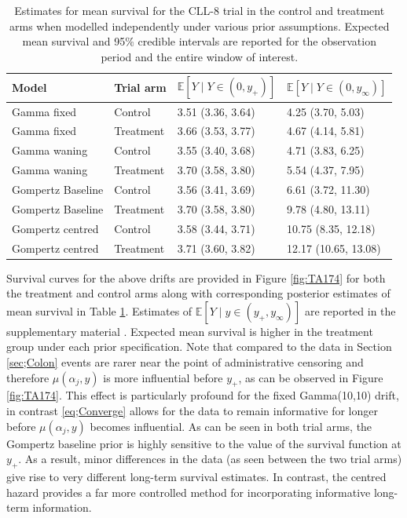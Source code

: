 \documentclass[ba,preprint]{imsart}
\theoremstyle{plain}
\theoremstyle{definition}
\theoremstyle{remark}
\begin{document}
\begin{table}[]
    \centering
    \begin{tabular}{l|l|l|l}
       Model & Trial arm & {\color{red}$\mathbb{E}[Y\mid Y \in (0,y_+)]$} & {\color{red}$\mathbb{E}[Y\mid Y \in (0,y_\infty)]$}\\
       \hline
        Gamma fixed  & Control  & 3.51 (3.36, 3.64) & 4.25 (3.70, 5.03) \\
        Gamma fixed  & Treatment  & 3.66	(3.53, 3.77) & 4.67	(4.14, 5.81) \\
        Gamma waning & Control & 3.55	(3.40, 3.68) & 4.71 (3.83, 6.25) \\
        Gamma waning & Treatment   & 3.70	(3.58, 3.80) & 5.54 (4.37, 7.95) \\
        Gompertz Baseline & Control & 3.56 (3.41, 3.69)	& 6.61 (3.72, 11.30) \\
        Gompertz Baseline & Treatment & 3.70 (3.58, 3.80)	& 9.78 (4.80, 13.11) \\
        Gompertz centred & Control & 3.58 (3.44, 3.71) & 10.75 (8.35, 12.18) \\
        Gompertz centred & Treatment & 3.71 (3.60, 3.82)	& 12.17 (10.65, 13.08) \\
        \hline
    \end{tabular}
    \caption{Estimates for mean survival for the CLL-8 trial in the control and treatment arms when modelled independently under various prior assumptions. Expected mean survival and 95\% credible intervals are reported for the observation period and the entire window of interest.}
    \label{tab:TA174}
\end{table}

Survival curves for the above drifts are provided in Figure \ref{fig:TA174} for both the treatment and control arms along with corresponding posterior estimates of mean survival in Table \ref{tab:TA174}. {\color{red}Estimates of $\mathbb{E}[Y\mid y \in(y_+,y_\infty)]$ are reported in the supplementary material \citep[Section 3.5]{Hardcastle2024supp}. Expected mean survival is higher in the treatment group under each prior specification.} Note that compared to the data in Section \ref{sec;Colon} events are rarer near the point of administrative censoring and therefore $\mu(\alpha_j,y)$ is more influential before $y_+$, as can be observed in Figure \ref{fig:TA174}. This effect is particularly profound for the fixed Gamma(10,10) drift, in contrast \eqref{eq;Converge} allows for the data to remain informative for longer before $\mu(\alpha_j,y)$ becomes influential. As can be seen in both trial arms, the Gompertz baseline prior is highly sensitive to the value of the survival function at $y_+$. As a result, minor differences in the data (as seen between the two trial arms) give rise to very different long-term survival estimates. In contrast, the centred hazard provides a far more controlled method for incorporating informative long-term information.
\end{document}
